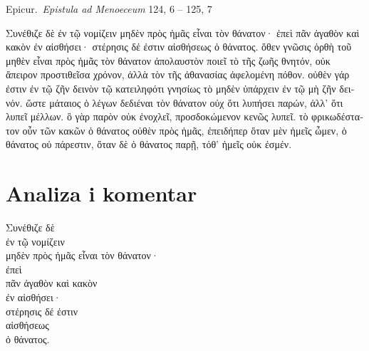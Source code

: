 Epicur.\ \textit{Epistula ad Menoeceum} 124, 6 – 125, 7


\medskip


{\large

\begin{greek}

\noindent Συνέθιζε δὲ ἐν τῷ νομίζειν μηδὲν πρὸς ἡμᾶς εἶναι τὸν θάνατον· ἐπεὶ πᾶν ἀγαθὸν καὶ κακὸν ἐν αἰσθήσει· στέρησις δέ ἐστιν αἰσθήσεως ὁ θάνατος. ὅθεν γνῶσις ὀρθὴ τοῦ μηθὲν εἶναι πρὸς ἡμᾶς τὸν θάνατον ἀπολαυστὸν ποιεῖ τὸ τῆς ζωῆς θνητόν, οὐκ ἄπειρον προστιθεῖσα χρόνον, ἀλλὰ τὸν τῆς ἀθανασίας ἀφελομένη πόθον. οὐθὲν γάρ ἐστιν ἐν τῷ ζῆν δεινὸν τῷ κατειληφότι γνησίως τὸ μηδὲν ὑπάρχειν ἐν τῷ μὴ ζῆν δεινόν. ὥστε μάταιος ὁ λέγων δεδιέναι τὸν θάνατον οὐχ ὅτι λυπήσει παρών, ἀλλ' ὅτι λυπεῖ μέλλων. ὃ γὰρ παρὸν οὐκ ἐνοχλεῖ, προσδοκώμενον κενῶς λυπεῖ. τὸ φρικωδέστατον οὖν τῶν κακῶν ὁ θάνατος οὐθὲν πρὸς ἡμᾶς, ἐπειδήπερ ὅταν μὲν ἡμεῖς ὦμεν, ὁ θάνατος οὐ πάρεστιν, ὅταν δὲ ὁ θάνατος παρῇ, τόθ' ἡμεῖς οὐκ ἐσμέν.

\end{greek}

}


\section*{Analiza i komentar}


{\large
\begin{greek}
\noindent Συνέθιζε δὲ \\
\tabto{2em} ἐν τῷ νομίζειν \\
μηδὲν πρὸς ἡμᾶς εἶναι τὸν θάνατον· \\
ἐπεὶ \\
\tabto{2em} πᾶν ἀγαθὸν καὶ κακὸν \\
\tabto{2em} ἐν αἰσθήσει· \\
στέρησις δέ ἐστιν \\
\tabto{2em} αἰσθήσεως \\
ὁ θάνατος.\\

\end{greek}
}


